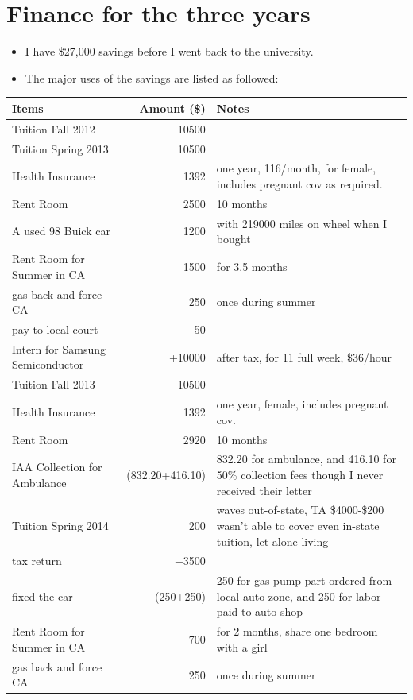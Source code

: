 \documentclass[9pt,b5paper]{article}
\begin{document}
\section{Finance for the three years}
\label{sec-7}
\begin{itemize}
\item I have \$27,000 savings before I went back to the university.
\item The major uses of the savings are listed as followed:
\end{itemize}
\begin{center}
\begin{tabular}{lrl}
\hline
Items & Amount (\$) & Notes\\
\hline
Tuition Fall 2012 & 10500 & \\
Tuition Spring 2013 & 10500 & \\
Health Insurance & 1392 & one year, 116/month, for female, includes pregnant cov as required.\\
Rent Room & 2500 & 10 months\\
A used 98 Buick car & 1200 & with 219000 miles on wheel when I bought\\
Rent Room for Summer in CA & 1500 & for 3.5 months\\
gas back and force CA & 250 & once during summer\\
pay to local court & 50 & \\
\hline
Intern for Samsung Semiconductor & +10000 & after tax, for 11 full week, \$36/hour\\
\hline
Tuition Fall 2013 & 10500 & \\
Health Insurance & 1392 & one year, female, includes pregnant cov.\\
Rent Room & 2920 & 10 months\\
IAA Collection for Ambulance & (832.20+416.10) & 832.20 for ambulance, and 416.10 for 50\% collection fees though I never received their letter\\
Tuition Spring 2014 & 200 & waves out-of-state, TA \$4000-\$200 wasn't able to cover even in-state tuition, let alone living\\
tax return & +3500 & \\
fixed the car & (250+250) & 250 for gas pump part ordered from local auto zone, and 250 for labor paid to auto shop\\
Rent Room for Summer in CA & 700 & for 2 months, share one bedroom with a girl\\
gas back and force CA & 250 & once during summer\\

\end{tabular}
\end{center}
\end{document}
